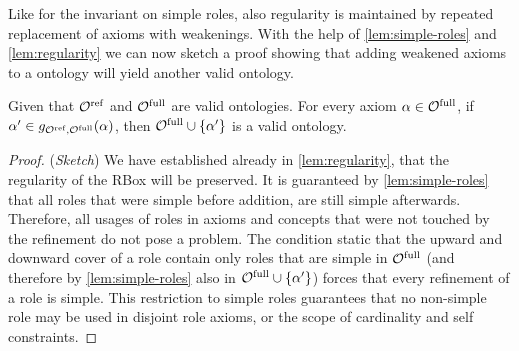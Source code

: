 Like for the invariant on simple roles, also regularity is maintained by repeated replacement of axioms with weakenings. With the help of \cref{lem:simple-roles} and \cref{lem:regularity} we can now sketch a proof showing that adding weakened axioms to a \SROIQ ontology will yield another valid \SROIQ ontology.

\begin{theorem} \label{lem:global-constraints}
  Given that ${\mathcal{O}^\textnormal{ref}}$ and ${\mathcal{O}^\textnormal{full}}$ are valid \SROIQ ontologies. For every axiom $\alpha \in {\mathcal{O}^\textnormal{full}}$, if $\alpha' \in g_{{\mathcal{O}^\textnormal{ref}},{\mathcal{O}^\textnormal{full}}}(\alpha)$, then ${\mathcal{O}^\textnormal{full}} \cup \{ \alpha' \}$ is a valid \SROIQ ontology.
\end{theorem}

\begin{proof}(\emph{Sketch})
  We have established already in \cref{lem:regularity}, that the regularity of the RBox will be preserved.
  It is guaranteed by \cref{lem:simple-roles} that all roles that were simple before addition, are still simple afterwards. Therefore, all usages of roles in axioms and concepts that were not touched by the refinement do not pose a problem. The condition static that the upward and downward cover of a role contain only roles that are simple in ${\mathcal{O}^\textnormal{full}}$ (and therefore by \cref{lem:simple-roles} also in ${\mathcal{O}^\textnormal{full}} \cup \{ \alpha' \}$) forces that every refinement of a role is simple. This restriction to simple roles guarantees that no non-simple role may be used in disjoint role axioms, or the scope of cardinality and self constraints.
\end{proof}
